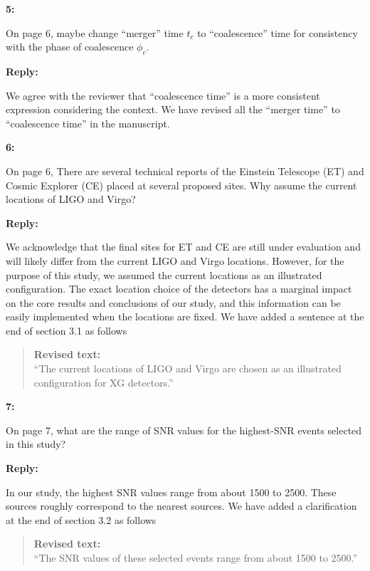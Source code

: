 \documentclass[11pt]{article}
\newenvironment{reviewercomment}[1]{
    \vspace{1em}
    \noindent \textbf{#1:} \itshape
}{
    \par\vspace{0.5em}
}
\newenvironment{authorresponse}{
    \noindent \textbf{Reply:} \normalfont
}{
    \par\vspace{1.5em}
}
\newenvironment{revisedtext}{
    \begin{quote}
    \color{revcolor} \small \textbf{Revised text:} \\
}{
    \end{quote}
}
\begin{document}
\begin{reviewercomment}{5}
    On page 6, maybe change ``merger'' time $t_c$ to ``coalescence'' time for consistency with the phase of coalescence $\phi_c$. 
\end{reviewercomment}

\begin{authorresponse}
    We agree with the reviewer that ``coalescence time'' is a more consistent
    expression considering the context. We have revised all the ``merger time'' to
    ``coalescence time'' in the manuscript.
\end{authorresponse}


\begin{reviewercomment}{6}
    On page 6, There are several technical reports of the Einstein Telescope (ET) and Cosmic Explorer (CE) placed at several proposed sites. Why assume the current locations of LIGO and Virgo? 
\end{reviewercomment}

\begin{authorresponse}
    We acknowledge that the final sites for ET and CE are still under evaluation
    and will likely differ from the current LIGO and Virgo locations. However,
    for the purpose of this study, we assumed the current locations as an illustrated
     configuration. The exact location choice of the detectors has
    a marginal impact on the core results and conclusions of our study, and this information can be easily implemented when the locations are fixed.
    We have added a sentence at the end of section 3.1 as follows
    \begin{revisedtext}
        ``The current locations of LIGO and Virgo are chosen as an illustrated configuration for XG detectors.''
    \end{revisedtext}
\end{authorresponse}


\begin{reviewercomment}{7}
    On page 7, what are the range of SNR values for the highest-SNR events selected in this study? 
\end{reviewercomment}

\begin{authorresponse}
    In our study, the highest SNR values range from about 1500 to 2500. These
    sources roughly correspond to the nearest sources. We have added a clarification  
    at the end of section 3.2 as follows
    \begin{revisedtext}
        ``The SNR values of these selected events range from about 1500 to 2500.''
    \end{revisedtext}
\end{authorresponse}
\end{document}
